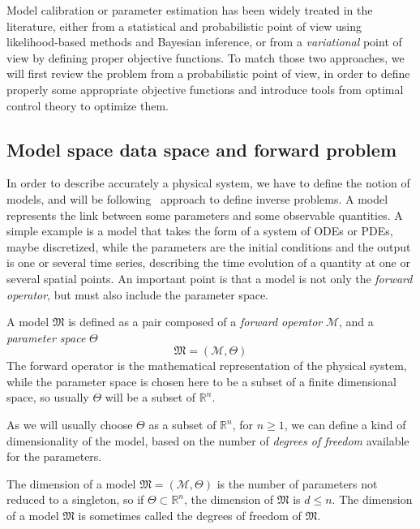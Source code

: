 \documentclass[../../Main_ManuscritThese.tex]{subfiles}
\begin{document}
Model calibration or parameter estimation has been widely treated in the literature, either from a statistical and probabilistic point of view using likelihood-based methods and Bayesian inference, or from a \emph{variational} point of view by defining proper objective functions. To match those two approaches, we will first review the problem from a probabilistic point of view, in order to define properly some appropriate objective functions and introduce tools from optimal control theory to optimize them.

 \subsection{Model space data space and forward problem}
\label{sec:model_space_data_space}
In order to describe accurately a physical system, we have to define the notion of models, and will be following~\cite{tarantola_inverse_2005} approach to define inverse problems.
 A model represents the link between some parameters and some observable quantities. A simple example is a model that takes the form of a system of ODEs or PDEs, maybe discretized, while the parameters are the initial conditions and the output is one or several time series, describing the time evolution of a quantity at one or several spatial points. An important point is that a model is not only the \emph{forward operator}, but must also include the parameter space.


 \begin{definition}[Model]
   \label{def:model}
  A model $\mathfrak{M}$ is defined as a pair composed of a \emph{forward operator} $\mathcal{M}$, and a \emph{parameter space} $\Theta$
  \begin{equation}
    \mathfrak{M} = (\mathcal{M}, \Theta)
  \end{equation}
The forward operator is the mathematical representation of the physical system, while the parameter space is chosen here to be a subset of a finite dimensional space, so usually $\Theta$ will be a subset of $\mathbb{R}^n$.
\end{definition}
As we will usually choose $\Theta$ as a subset of $\mathbb{R}^n$, for $n\geq 1$, we can define a kind of dimensionality of the model, based on the number of \emph{degrees of freedom} available for the parameters.


\begin{remark}
  \label{rmk:model_dimension}
  The dimension of a model $\mathfrak{M}=(\mathcal{M},\Theta)$ is the number of parameters not reduced to a singleton, so if $\Theta \subset \mathbb{R}^n$, the dimension of $\mathfrak{M}$ is $d \leq n$. The dimension of a model $\mathfrak{M}$ is sometimes called the degrees of freedom of $\mathfrak{M}$.
  \end{remark}
\end{document}
